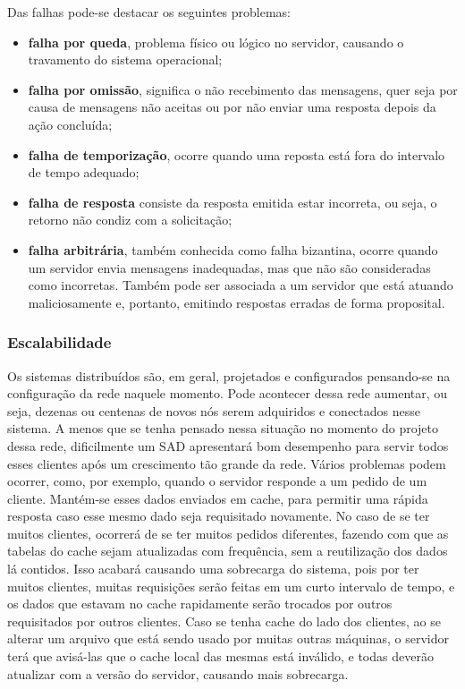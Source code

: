 	Das falhas pode-se destacar os seguintes problemas:
	\begin{itemize}
		\item \textbf{falha por queda}, problema físico ou lógico no servidor, causando o travamento do sistema operacional;
		
		\item \textbf{falha por omissão}, significa o não recebimento das mensagens, quer seja por causa de mensagens não aceitas ou por não enviar uma resposta depois da ação concluída;
		
		\item \textbf{falha de temporização}, ocorre quando uma reposta está fora do intervalo de tempo adequado;
		
		\item \textbf{falha de resposta} consiste da resposta emitida estar incorreta, ou seja, o retorno não condiz com a solicitação;
		
		\item \textbf{falha arbitrária}, também conhecida como falha bizantina, ocorre quando um
		servidor envia mensagens inadequadas, mas que não são consideradas como incorretas.
		Também pode ser associada a um servidor que está atuando maliciosamente
		e, portanto, emitindo respostas erradas de forma proposital.
		
	\end{itemize}
	
	
	\subsubsection{Escalabilidade}
	Os sistemas distribuídos são, em geral, projetados e configurados pensando-se na configuração da rede naquele momento. Pode acontecer dessa rede aumentar, ou seja, dezenas ou centenas de novos nós serem adquiridos e conectados nesse sistema. A menos que se tenha pensado nessa situação no momento do projeto dessa rede, dificilmente um SAD apresentará bom desempenho para servir todos esses clientes após um crescimento tão grande da rede. Vários problemas podem ocorrer, como, por exemplo, quando o servidor responde a um pedido de um cliente. Mantém-se esses dados enviados em cache, para permitir uma rápida resposta caso esse mesmo dado seja requisitado novamente. No caso de se ter muitos clientes, ocorrerá de se ter muitos pedidos diferentes, fazendo com que as tabelas do cache sejam atualizadas com frequência, sem a reutilização dos dados lá contidos. Isso acabará causando uma sobrecarga do sistema, pois por ter muitos clientes, muitas requisições serão feitas em um curto intervalo de tempo, e os dados que estavam no cache rapidamente serão trocados por outros requisitados por outros clientes. Caso se tenha cache do lado dos clientes, ao se alterar um arquivo que está sendo usado por muitas outras máquinas, o servidor terá que avisá-las que o cache local das mesmas está inválido, e todas deverão atualizar com a versão do servidor, causando mais sobrecarga. \\
	
